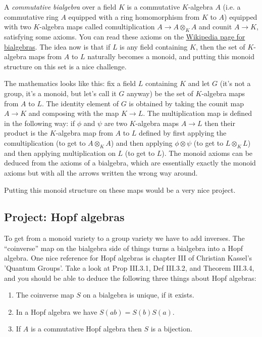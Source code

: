 \documentclass{amsart}
\begin{document}
A \emph{commutative bialgebra} over a field $K$ is a commutative $K$-algebra $A$ (i.e. a commutative ring $A$ equipped with a ring homomorphism from $K$ to $A$) equipped with two $K$-algebra maps called comultiplication $A\to A \otimes_KA$ and counit $A\to K$, satisfying some axioms. You can read these axioms on the \href{https://en.wikipedia.org/wiki/Bialgebra}{Wikipedia page for bialgebras}. The idea now is that if $L$ is any field containing $K$, then the set of $K$-algebra maps from $A$ to $L$ naturally becomes a monoid, and putting this monoid structure on this set is a nice challenge.

The mathematics looks like this: fix a field $L$ containing $K$ and let $G$ (it's not a group, it's a monoid, but let's call it $G$ anyway) be the set of $K$-algebra maps from $A$ to $L$. The identity element of $G$ is obtained by taking the counit map $A\to K$ and composing with the map $K\to L$. The multiplication map is defined in the following way: if $\phi$ and $\psi$ are two $K$-algebra maps $A\to L$ then their product is the $K$-algebra map from $A$ to $L$ defined by first applying the comultiplication (to get to $A\otimes_K A$) and then applying $\phi\otimes\psi$ (to get to $L\otimes_K L$) and then applying multiplication on $L$ (to get to $L$). The monoid axioms can be deduced from the axioms of a bialgebra, which are essentially exactly the monoid axioms but with all the arrows written the wrong way around.

Putting this monoid structure on these maps would be a very nice project.

\subsection{Project: Hopf algebras}

To get from a monoid variety to a group variety we have to add inverses. The ``coinverse'' map on the bialgebra side of things turns a bialgebra into a Hopf algebra. One nice reference for Hopf algebras is chapter III of Christian Kassel's 'Quantum Groups'. Take a look at Prop III.3.1, Def III.3.2, and Theorem III.3.4, and you should be able to deduce the following three things about Hopf algebras:

\begin{enumerate}
\item The coinverse map $S$ on a bialgebra is unique, if it exists.
\item In a Hopf algebra we have $S(ab)=S(b)S(a)$.
\item If $A$ is a commutative Hopf algebra then $S$ is a bijection.
\end{enumerate}
\end{document}
